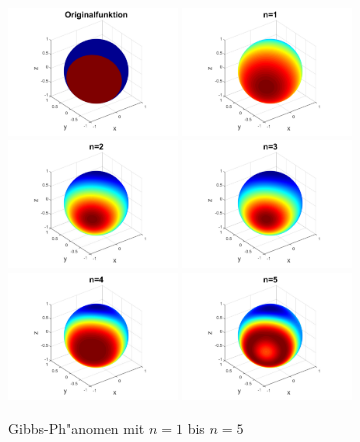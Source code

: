 \begin{refsection}
\begin{figure}%
\centering
\includegraphics[width=0.4\textwidth]{kugel/Gibbs/GibbsOriginalFunktion.pdf}
\includegraphics[width=0.4\textwidth]{kugel/Gibbs/GibbsN_1.pdf}
\includegraphics[width=0.4\textwidth]{kugel/Gibbs/GibbsN_2.pdf}
\includegraphics[width=0.4\textwidth]{kugel/Gibbs/GibbsN_3.pdf}
\includegraphics[width=0.4\textwidth]{kugel/Gibbs/GibbsN_4.pdf}
\includegraphics[width=0.4\textwidth]{kugel/Gibbs/GibbsN_5.pdf}
\caption{Gibbs-Ph"anomen mit $n=1$ bis $n=5$
\label{skript:Gibbs1}}
\end{figure}


\end{refsection}
